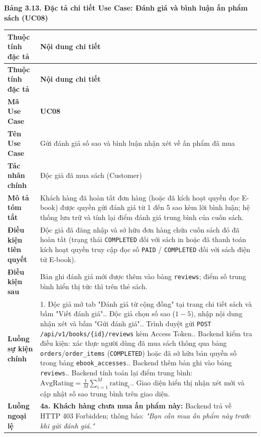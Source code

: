 \documentclass[11pt, a4paper]{report}
\begin{document}
\vspace{0.3cm}
\noindent\textbf{Bảng 3.13. Đặc tả chi tiết Use Case: Đánh giá và bình luận ấn phẩm sách (UC08)}

\begin{longtable}{p{3.8cm} p{10.5cm}}
\toprule
\textbf{Thuộc tính đặc tả} & \textbf{Nội dung chi tiết} \\
\midrule
\endfirsthead
\toprule
\textbf{Thuộc tính đặc tả} & \textbf{Nội dung chi tiết} \\
\midrule
\endhead
\bottomrule
\endfoot
\textbf{Mã Use Case} & \textbf{UC08} \\
\midrule
\textbf{Tên Use Case} & Gửi đánh giá số sao và bình luận nhận xét về ấn phẩm đã mua \\
\midrule
\textbf{Tác nhân chính} & Độc giả đã mua sách (Customer) \\
\midrule
\textbf{Mô tả tóm tắt} & Khách hàng đã hoàn tất đơn hàng (hoặc đã kích hoạt quyền đọc E-book) được quyền gửi đánh giá từ 1 đến 5 sao kèm lời bình luận; hệ thống lưu trữ và tính lại điểm đánh giá trung bình của cuốn sách. \\
\midrule
\textbf{Điều kiện tiên quyết} & Độc giả đã đăng nhập và sở hữu đơn hàng chứa cuốn sách đó đã hoàn tất (trạng thái \texttt{COMPLETED} đối với sách in hoặc đã thanh toán kích hoạt quyền truy cập đọc số \texttt{PAID} / \texttt{COMPLETED} đối với sách điện tử E-book). \\
\midrule
\textbf{Điều kiện sau} & Bản ghi đánh giá mới được thêm vào bảng \texttt{reviews}; điểm số trung bình hiển thị tức thì trên thẻ sách. \\
\midrule
\textbf{Luồng sự kiện chính} & 
1. Độc giả mở tab "Đánh giá từ cộng đồng" tại trang chi tiết sách và bấm "Viết đánh giá".\newline
2. Độc giả chọn số sao ($1 - 5$), nhập nội dung nhận xét và bấm "Gửi đánh giá".\newline
3. Trình duyệt gửi \texttt{POST /api/v1/books/\{id\}/reviews} kèm Access Token.\newline
4. Backend kiểm tra điều kiện: xác thực người dùng đã mua sách thông qua bảng \texttt{orders}/\texttt{order\_items} (\texttt{COMPLETED}) hoặc đã sở hữu bản quyền số trong bảng \texttt{ebook\_accesses}.\newline
5. Backend thêm bản ghi vào bảng \texttt{reviews}.\newline
6. Backend tính toán lại điểm trung bình: $\text{AvgRating} = \frac{1}{M}\sum_{i=1}^M \text{rating}_i$.\newline
7. Giao diện hiển thị nhận xét mới và cập nhật số sao trung bình trên giao diện. \\
\midrule
\textbf{Luồng ngoại lệ} & 
\textbf{4a. Khách hàng chưa mua ấn phẩm này:} Backend trả về HTTP 403 Forbidden; thông báo: \textit{"Bạn cần mua ấn phẩm này trước khi gửi đánh giá."} \\
\bottomrule
\end{longtable}
\end{document}
